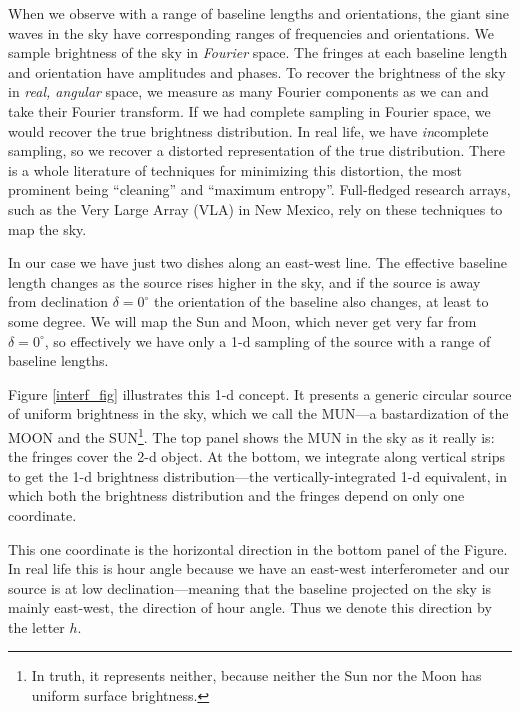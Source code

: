 \documentclass[11pt,preprint]{aastex}
\begin{document}
	When we observe with a range of baseline lengths and
orientations, the giant sine waves in the sky have corresponding ranges
of frequencies and orientations. We sample brightness of the sky in {\it
Fourier} space. The fringes at each baseline length and orientation have
amplitudes and phases. To recover the brightness of the sky in {\it
real, angular} space, we measure as many Fourier components as we can
and take their Fourier transform. If we had complete sampling in Fourier
space, we would recover the true brightness distribution. In real life,
we have {\it in}complete sampling, so we recover a distorted
representation of the true distribution. There is a whole literature 
of techniques for minimizing this distortion, the most prominent being
``cleaning'' and ``maximum entropy''. Full-fledged research arrays, such
as the Very Large Array (VLA) in New Mexico, rely on these techniques to
map the sky.

	In our case we have just two dishes along an east-west line. The
effective baseline length changes as the source rises higher in the sky,
and if the source is away from declination $\delta = 0^\circ$ the
orientation of the baseline also changes, at least to some degree. We
will map the Sun and Moon, which never get very far from $\delta =
0^\circ$, so effectively we have only a 1-d sampling of the source with
a range of baseline lengths. 

	Figure \ref{interf_fig} illustrates this 1-d concept. It presents a generic
circular  source of uniform brightness in the sky, which we call the
MUN---a bastardization of the MOON and the SUN\footnote{In truth, it
represents neither, because neither the Sun nor the Moon has uniform
surface brightness.}. The top panel shows the MUN in the sky as it
really is: the fringes cover the 2-d object. At the bottom, we integrate
along vertical strips to get the 1-d brightness distribution---the
vertically-integrated 1-d equivalent, in which both the brightness
distribution and the fringes depend on only one coordinate. 

	This one coordinate is the horizontal direction in the bottom
panel of the Figure. In real life this is hour angle because we have an
east-west interferometer and our source is at low declination---meaning
that the baseline projected on the sky is mainly east-west, the
direction of hour angle. Thus we denote this direction by the letter
$h$. 
\end{document}
